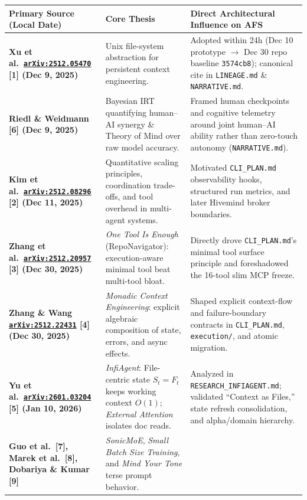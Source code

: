 \documentclass[10pt,letterpaper]{article}
\newcommand{\code}[1]{\texttt{\color{InkNavy}#1}}
\newcommand{\arxiv}[1]{\href{https://arxiv.org/abs/#1}{\code{arXiv:#1}}}
\begin{document}
\begin{table}[ht!]
\centering
\sffamily\footnotesize
\begin{tabularx}{\textwidth}{@{}>{\raggedright\bfseries\arraybackslash}p{3.9cm} >{\raggedright\arraybackslash}p{4.3cm} >{\raggedright\arraybackslash}X@{}}
\toprule
\color{InkNavy}Primary Source (Local Date) & \color{InkNavy}Core Thesis & \color{InkNavy}Direct Architectural Influence on AFS \\
\midrule
Xu et al.\ \arxiv{2512.05470} [1] (Dec 9, 2025) &
Unix file-system abstraction for persistent context engineering. &
Adopted within 24h (Dec 10 prototype $\rightarrow$ Dec 30 repo baseline \code{3574cb8}); canonical cite in \code{LINEAGE.md} \& \code{NARRATIVE.md}. \\
\addlinespace[2.5pt]
Riedl \& Weidmann [6] (Dec 9, 2025) &
Bayesian IRT quantifying human--AI synergy \& Theory of Mind over raw model accuracy. &
Framed human checkpoints and cognitive telemetry around joint human--AI ability rather than zero-touch autonomy (\code{NARRATIVE.md}). \\
\addlinespace[2.5pt]
Kim et al.\ \arxiv{2512.08296} [2] (Dec 11, 2025) &
Quantitative scaling principles, coordination trade-offs, and tool overhead in multi-agent systems. &
Motivated \code{CLI\_PLAN.md} observability hooks, structured run metrics, and later Hivemind broker boundaries. \\
\addlinespace[2.5pt]
Zhang et al.\ \arxiv{2512.20957} [3] (Dec 30, 2025) &
\emph{One Tool Is Enough} (RepoNavigator): execution-aware minimal tool beat multi-tool bloat. &
Directly drove \code{CLI\_PLAN.md}'s minimal tool surface principle and foreshadowed the 16-tool slim MCP freeze. \\
\addlinespace[2.5pt]
Zhang \& Wang \arxiv{2512.22431} [4] (Dec 30, 2025) &
\emph{Monadic Context Engineering}: explicit algebraic composition of state, errors, and async effects. &
Shaped explicit context-flow and failure-boundary contracts in \code{CLI\_PLAN.md}, \code{execution/}, and atomic migration. \\
\addlinespace[2.5pt]
Yu et al.\ \arxiv{2601.03204} [5] (Jan 10, 2026) &
\emph{InfiAgent}: File-centric state $S_t = F_t$ keeps working context $O(1)$; \emph{External Attention} isolates doc reads. &
Analyzed in \code{RESEARCH\_INFIAGENT.md}; validated ``Context as Files,'' state refresh consolidation, and alpha/domain hierarchy. \\
\addlinespace[2.5pt]
Guo et al.\ [7], Marek et al.\ [8], Dobariya \& Kumar [9] &
\emph{SonicMoE}, \emph{Small Batch Size Training}, and \emph{Mind Your Tone} terse prompt behavior. &

\end{tabularx}
\end{table}
\end{document}
